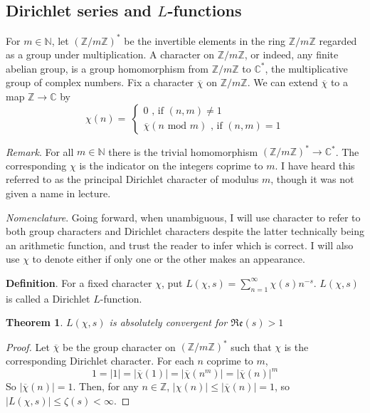 \documentclass[12pt]{article}
\newcommand{\nats}{\mathbb{N}}
\newcommand{\ints}{\mathbb{Z}}
\newcommand{\complex}{\mathbb{C}}
\newcommand{\intsmod}[1]{\ints / #1 \ints}
\newtheorem{thm}{Theorem}
\numberwithin{equation}{section}
\numberwithin{thm}{section}
\numberwithin{lemma}{section}
\numberwithin{cor}{section}
\begin{document}
\subsection{Dirichlet series and $L$-functions}

For $m \in \nats$, let $(\intsmod{m})^*$ be the invertible elements in the ring $\intsmod{m}$ regarded as a group under multiplication. A character on $\intsmod{m}$, or indeed, any finite abelian group, is a group homomorphism from $\intsmod{m}$ to $\complex^*$, the multiplicative group of complex numbers. Fix a character $\overline{\chi}$ on $\intsmod{m}$. We can extend $\overline{\chi}$ to a map $\ints \to \complex$ by \begin{equation*}\chi(n) =~\begin{cases*} 0 \text{ , if } (n, m) \ne 1 \\ \overline{\chi}(n \text{ mod } m) \text{ , if } (n, m) = 1 \end{cases*}\end{equation*}

\textit{Remark}. For all $m \in \nats$ there is the trivial homomorphism $(\intsmod{m})^* \to \complex^*$. The corresponding $\chi$ is the indicator on the integers coprime to $m$. I have heard this referred to as the principal Dirichlet character of modulus $m$, though it was not given a name in lecture. 

\textit{Nomenclature}. Going forward, when unambiguous, I will use character to refer to both group characters and Dirichlet characters despite the latter technically being an arithmetic function, and trust the reader to infer which is correct. I will also use $\chi$ to denote either if only one or the other makes an appearance.

\textbf{Definition}. For a fixed character $\chi$, put $L(\chi, s) = \sum_{n = 1}^{\infty} \chi(s) n^{-s}$. $L(\chi, s)$ is called a Dirichlet $L$-function.

\begin{thm}\label{AbsoluteConvergenceOfLFunction}
  $L(\chi, s)$ is absolutely convergent for $\mathfrak{Re}(s) > 1$
\end{thm}
\begin{proof}
  Let $\overline{\chi}$ be the group character on $(\intsmod{m})^*$ such that $\chi$ is the corresponding Dirichlet character. For each $n$ coprime to $m$, \begin{equation*} 1 = |1| = |\overline{\chi}(1)| = |\overline{\chi}(n^m)| = |\overline{\chi}(n)|^m \end{equation*} So $|\overline{\chi}(n)| = 1$. Then, for any $n \in \ints$, $|\chi(n)| \leq |\overline{\chi}(n)| = 1$, so $|L(\chi, s)| \leq \zeta(s) < \infty$.
\end{proof}
\end{document}
